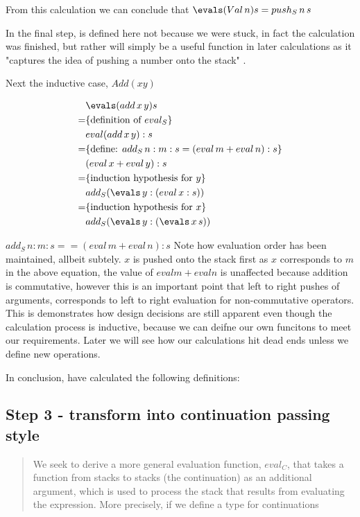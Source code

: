 \documentclass {article}
\begin{document}
From this calculation we can conclude that \( \evals (Val \, n) s = \pushs \, n \, s \)

In the final step, \pushs is defined here not because we were stuck, in fact the calculation was finished, but rather \pushs will simply be a useful function in later calculations as it "captures the idea of pushing a number onto the stack" \cite{bandh}.


Next the inductive case, $Add(x y)$

\newcommand{\adds}{add_{S}}

\begin{eqnarray*}
	     & \evals (add \, x \, y) s \\
	=    & \{\mbox{definition of $eval_S$}\} \\
	     & eval (add \, x \, y):s	\\
	=    & \{\mbox{define: $\adds \, n:m:s 
			= (eval \, m + eval \, n): s$}\} \\
	     & (eval \, x + eval \,y):s \\
	=    & \{\mbox{induction hypothesis for $y$}\} \\
	     & \adds(\evals \, y: (eval \, x:s)) \\
	=    & \{\mbox{induction hypothesis for $x$}\} \\
	     & \adds(\evals \, y: (\evals \, x \, s)) \\
\end{eqnarray*}

\( \adds \, n:m:s == (eval \, m + eval \, n): s \)
Note how evaluation order has been maintained, allbeit subtely. $x$ is pushed onto the stack first as $x$ corresponds to $m$ in the above equation,
the value of $eval m + eval n$ is unaffected because addition is commutative, however this is an important point that left to right pushes of arguments, corresponds to left to right evaluation for non-commutative operators.
This is demonstrates how design decisions are still apparent even though the calculation process is inductive, because we can deifne our own funcitons to meet our requirements.
Later we will see how our calculations hit dead ends unless we define new operations.

In conclusion, \BH have calculated the following definitions:


\subsection{Step 3 - transform into continuation passing style}
\begin{quotation}
	We seek to derive a more general evaluation function, $eval_{C}$, that takes a function from stacks to stacks (the continuation) as an additional argument, which is used to process the stack that results from evaluating the expression. More precisely, if we define a type for continuations
\end{quotation}
	
\end{document}
